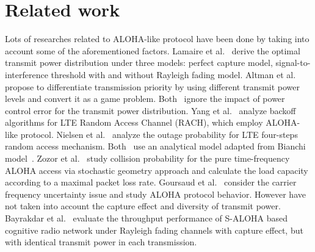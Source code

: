 \section{Related work}
Lots of researches related to ALOHA-like protocol have been done by taking into account some of the aforementioned factors. Lamaire et al.~\cite{lamaire1998randomization} derive the optimal transmit power distribution under three models: perfect capture model, signal-to-interference threshold with and without Rayleigh fading model. Altman et al.~\cite{altman2005slotted} propose to differentiate transmission priority by using different transmit power levels and convert it as a game problem. Both~\cite{lamaire1998randomization}\cite{altman2005slotted} ignore the impact of power control error for the transmit power distribution. 
Yang et al.~\cite{yang2012performance} analyze backoff algorithms for LTE Random Access Channel (RACH), which employ ALOHA-like protocol. Nielsen et al.~\cite{nielsen2015tractable} analyze the outage probability for LTE four-steps random access mechanism. Both~\cite{yang2012performance}\cite{nielsen2015tractable} use an analytical model adapted from Bianchi model~\cite{bianchi2000performance}. 
Zozor et al.~\cite{zozor2016time} study collision probability for the pure time-frequency ALOHA access via stochastic geometry approach and calculate the load capacity according to a maximal packet loss rate. 
Goursaud et al.~\cite{goursaud2016random} consider the carrier frequency uncertainty issue and study ALOHA protocol behavior. However \cite{yang2012performance}\cite{nielsen2015tractable}\cite{bianchi2000performance}\cite{zozor2016time}\cite{goursaud2016random} have not taken into account the capture effect and diversity of transmit power.
Bayrakdar et al.~\cite{bayrakdar2016slotted} evaluate the throughput performance of S-ALOHA based cognitive radio network under Rayleigh fading channels with capture effect, but with identical transmit power in each transmission. 


